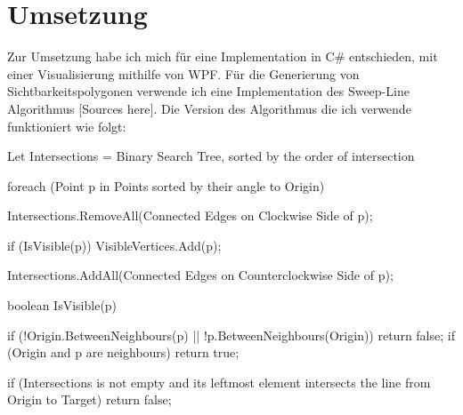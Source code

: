 \documentclass[12pt]{article}
\begin{document}
\section{Umsetzung}
Zur Umsetzung habe ich mich für eine Implementation in C\# entschieden, mit einer Visualisierung mithilfe von WPF.
Für die Generierung von Sichtbarkeitspolygonen verwende ich eine Implementation des Sweep-Line Algorithmus [Sources here]. Die Version des Algorithmus die ich verwende funktioniert wie folgt:
\begin{Csharp}
Let Intersections = Binary Search Tree, sorted by the order of intersection

foreach (Point p in Points sorted by their angle to Origin) {
	Intersections.RemoveAll(Connected Edges on Clockwise Side of p); 
	
	if (IsVisible(p)) VisibleVertices.Add(p);	
	
	Intersections.AddAll(Connected Edges on Counterclockwise Side of p);
}

boolean IsVisible(p) {
    if (!Origin.BetweenNeighbours(p) || !p.BetweenNeighbours(Origin)) return false;
    if (Origin and p are neighbours) return true;

    if (Intersections is not empty and its leftmost element intersects the line from Origin to Target) return false;
}
\end{Csharp}
\end{document}
